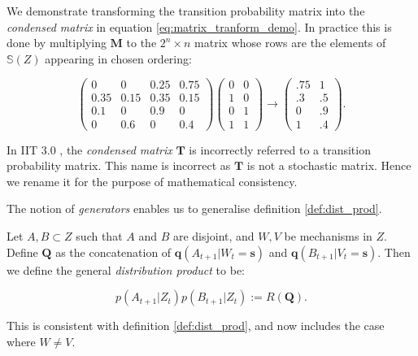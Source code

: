 We demonstrate transforming the transition probability matrix into the \textit{condensed matrix} in equation \ref{eq:matrix_tranform_demo}. In practice this is done by multiplying $\mathbf{M}$ to the $2^n \times n$ matrix whose rows are the elements of $\mathbb{S}(Z)$ appearing in chosen ordering:



\begin{equation}
\label{eq:matrix_tranform_demo}
\left( \begin{array}{cccc} 0&0&0.25&0.75\\
							0.35&0.15&0.35&0.15\\
							0.1&0&0.9&0\\
							0&0.6&0&0.4
							\end{array} \right) 							
\left(\begin{array}{cc}0&0\\
1&0\\
0&1\\
1&1 \end{array} \right)
\rightarrow \left( \begin{array}{cc}.75&1\\
											.3&.5\\
											0&.9\\
											1&.4 \end{array} \right).
\end{equation}

\begin{remark}
	In IIT 3.0 \cite{oizumi2014phenomenology}, the \textit{condensed matrix} $\mathbf{T}$ is incorrectly referred to a transition probability matrix. This name is incorrect as $\mathbf{T}$ is not a stochastic matrix. Hence we rename it for the purpose of mathematical consistency.
\end{remark}

The notion of \textit{generators} enables us to generalise definition \ref{def:dist_prod}. 

\begin{definition}
	\label{def:dist_prod_gen}
	Let $A, B \subset Z$ such that $A$ and $B$ are disjoint, and $W,V$ be mechanisms in $Z$. Define $\mathbf{Q}$ as the concatenation of $\mathbf{q}(A_{t+1}|W_t = \mathbf{s})$ and 	$\mathbf{q}(B_{t+1}|V_t = \mathbf{s})$. Then we define the general \textit{distribution product} to be:
	
	\[p(A_{t+1}|Z_t)p(B_{t+1}|Z_t):=R(\mathbf{Q}).\]
	
	This is consistent with definition \ref{def:dist_prod}, and now includes the case where $W \neq V$.
\end{definition}

